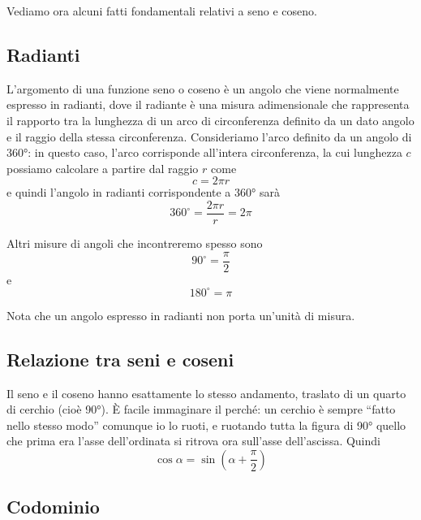 \documentclass[11pt]{report}
\begin{document}
Vediamo ora alcuni fatti fondamentali relativi a seno e coseno.

\subsection{Radianti}

L'argomento di una funzione seno o coseno è un angolo che viene normalmente espresso in radianti, dove il radiante è una misura adimensionale che rappresenta il rapporto tra la lunghezza di un arco di circonferenza definito da un dato angolo e il raggio della stessa circonferenza. Consideriamo l'arco definito da un angolo di 360°: in questo caso, l'arco corrisponde all'intera circonferenza, la cui lunghezza $c$ possiamo calcolare a partire dal raggio $r$ come
\begin{equation}
c = 2 \pi r
\end{equation}
e quindi l'angolo in radianti corrispondente a 360° sarà
\begin{equation}
360^{\circ} = \frac{2 \pi r}{r} = 2 \pi
\end{equation}

Altri misure di angoli che incontreremo spesso sono
\begin{equation}
90^{\circ} = \frac{\pi}{2}
\end{equation}
e
\begin{equation}
180^{\circ} = \pi
\end{equation}

Nota che un angolo espresso in radianti non porta un'unità di misura.


\subsection{Relazione tra seni e coseni}

Il seno e il coseno hanno esattamente lo stesso andamento, traslato di un quarto di cerchio (cioè 90°). È facile immaginare il perché: un cerchio è sempre ``fatto nello stesso modo'' comunque io lo ruoti, e ruotando tutta la figura di 90° quello che prima era l'asse dell'ordinata si ritrova ora sull'asse dell'ascissa. Quindi
\begin{equation}
\cos \alpha = \sin(\alpha + \frac{\pi}{2})
\end{equation}


\subsection{Codominio}
\end{document}
